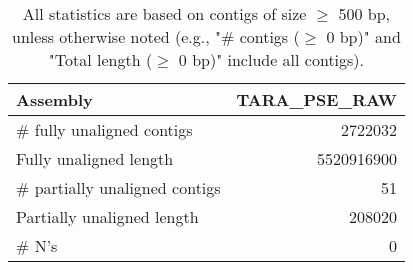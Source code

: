 \documentclass[12pt,a4paper]{article}
\begin{document}
\begin{table}[ht]
\begin{center}
\caption{All statistics are based on contigs of size $\geq$ 500 bp, unless otherwise noted (e.g., "\# contigs ($\geq$ 0 bp)" and "Total length ($\geq$ 0 bp)" include all contigs).}
\begin{tabular}{|l*{1}{|r}|}
\hline
Assembly & TARA\_PSE\_RAW \\ \hline
\# fully unaligned contigs & 2722032 \\ \hline
Fully unaligned length & 5520916900 \\ \hline
\# partially unaligned contigs & 51 \\ \hline
Partially unaligned length & 208020 \\ \hline
\# N's & 0 \\ \hline
\end{tabular}
\end{center}
\end{table}
\end{document}
